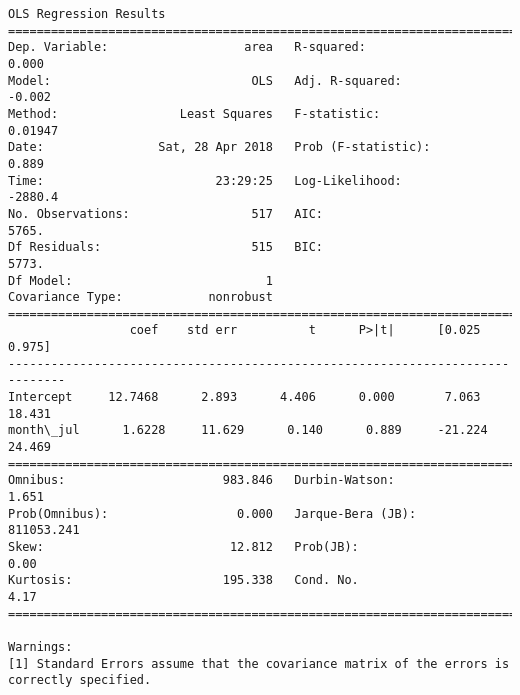 \documentclass[11pt]{article}
\begin{document}
\begin{Verbatim}[commandchars=\\\{\}]
                            OLS Regression Results                            
==============================================================================
Dep. Variable:                   area   R-squared:                       0.000
Model:                            OLS   Adj. R-squared:                 -0.002
Method:                 Least Squares   F-statistic:                   0.01947
Date:                Sat, 28 Apr 2018   Prob (F-statistic):              0.889
Time:                        23:29:25   Log-Likelihood:                -2880.4
No. Observations:                 517   AIC:                             5765.
Df Residuals:                     515   BIC:                             5773.
Df Model:                           1                                         
Covariance Type:            nonrobust                                         
==============================================================================
                 coef    std err          t      P>|t|      [0.025      0.975]
------------------------------------------------------------------------------
Intercept     12.7468      2.893      4.406      0.000       7.063      18.431
month\_jul      1.6228     11.629      0.140      0.889     -21.224      24.469
==============================================================================
Omnibus:                      983.846   Durbin-Watson:                   1.651
Prob(Omnibus):                  0.000   Jarque-Bera (JB):           811053.241
Skew:                          12.812   Prob(JB):                         0.00
Kurtosis:                     195.338   Cond. No.                         4.17
==============================================================================

Warnings:
[1] Standard Errors assume that the covariance matrix of the errors is correctly specified.



\end{Verbatim}
\end{document}
